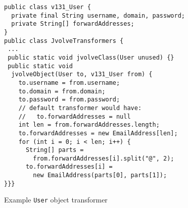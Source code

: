 \begin{figure}
\begin{small}
\begin{verbatim}
public class v131_User {
  private final String username, domain, password;
  private String[] forwardAddresses;
}
public class JvolveTransformers {
 ...
 public static void jvolveClass(User unused) {}
 public static void
  jvolveObject(User to, v131_User from) {
    to.username = from.username;
    to.domain = from.domain;
    to.password = from.password;
    // default transformer would have:
    //   to.forwardAddresses = null
    int len = from.forwardAddresses.length;
    to.forwardAddresses = new EmailAddress[len];
    for (int i = 0; i < len; i++) {
      String[] parts =
        from.forwardAddresses[i].split("@", 2);
      to.forwardAddresses[i] =
        new EmailAddress(parts[0], parts[1]);
}}}
\end{verbatim}
\end{small}
\caption{Example {\tt User} object transformer}
\label{fig:example-xform}
\end{figure}

